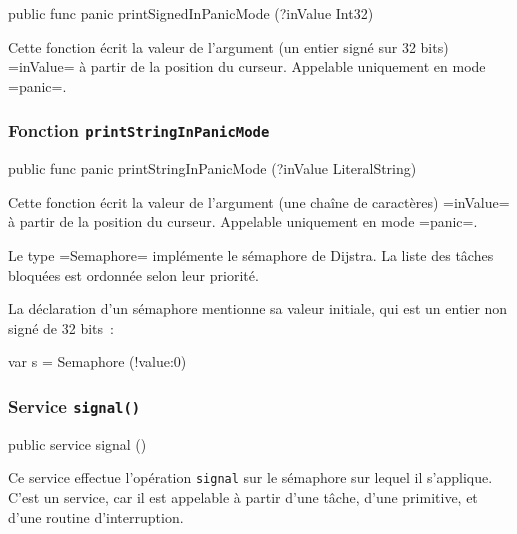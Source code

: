 \begin{OMNIBUS}
  public func panic printSignedInPanicMode (?inValue Int32)
\end{OMNIBUS}

Cette fonction écrit la valeur de l'argument (un entier signé sur 32 bits) \omnibus=inValue= à partir de la position du curseur. Appelable uniquement en mode \omnibus=panic=.







\subsubsection{Fonction \texttt{printStringInPanicMode}}

\begin{OMNIBUS}
  public func panic printStringInPanicMode (?inValue LiteralString)
\end{OMNIBUS}

Cette fonction écrit la valeur de l'argument (une chaîne de caractères) \omnibus=inValue= à partir de la position du curseur. Appelable uniquement en mode \omnibus=panic=.









Le type \omnibus=Semaphore= implémente le sémaphore de Dijstra. La liste des tâches bloquées est ordonnée selon leur priorité.


La déclaration d'un sémaphore mentionne sa valeur initiale, qui est un entier non signé de 32 bits~:

\begin{OMNIBUS}
  var s = Semaphore (!value:0)
\end{OMNIBUS}


\subsubsection{Service \texttt{signal()}}

\begin{OMNIBUS}
  public service signal ()
\end{OMNIBUS}

Ce service effectue l'opération \texttt{signal} sur le sémaphore sur lequel il s'applique. C'est un service, car il est appelable à partir d'une tâche, d'une primitive, et d'une routine d'interruption.



